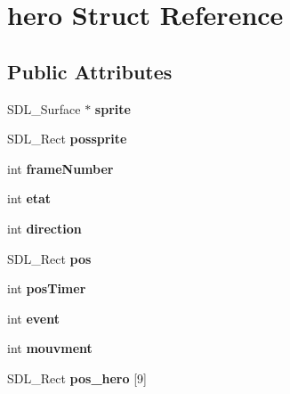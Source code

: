 \hypertarget{structhero}{}\section{hero Struct Reference}
\label{structhero}
\subsection*{Public Attributes}
\begin{DoxyCompactItemize}
\item 
\mbox{\label{structhero_a983d5dd611b38115f1b9177fb1e54bff}} 
S\+D\+L\+\_\+\+Surface $\ast$ {\bfseries sprite}
\item 
\mbox{\label{structhero_a45947b3c9db48dca2a272da9da75a429}} 
S\+D\+L\+\_\+\+Rect {\bfseries possprite}
\item 
\mbox{\label{structhero_af6bf9a5c08ae7e3c064b57a5e8e5fe64}} 
int {\bfseries frame\+Number}
\item 
\mbox{\label{structhero_aa628c0174ff3d1942273de389c7cfae9}} 
int {\bfseries etat}
\item 
\mbox{\label{structhero_a362c6e74cce0d52538c606ba7b05a50f}} 
int {\bfseries direction}
\item 
\mbox{\label{structhero_a194cbf9b9821cedf4708160c8fb186dd}} 
S\+D\+L\+\_\+\+Rect {\bfseries pos}
\item 
\mbox{\label{structhero_adf2bf13fce1ffbfa00d89e62b8801cb3}} 
int {\bfseries pos\+Timer}
\item 
\mbox{\label{structhero_ad7320fdd471b66b068b981534a5052b1}} 
int {\bfseries event}
\item 
\mbox{\label{structhero_a2e29e9bbf40ce21c919020cab377c459}} 
int {\bfseries mouvment}
\item 
\mbox{\label{structhero_a3cf2835573057cabad180f997bb25f8e}} 
S\+D\+L\+\_\+\+Rect {\bfseries pos\+\_\+hero} \mbox{[}9\mbox{]}
\item 
\mbox{\label{structhero_abb55d138bcf98636f5763bc8db7a8aa2}} 

\end{DoxyCompactItemize}
